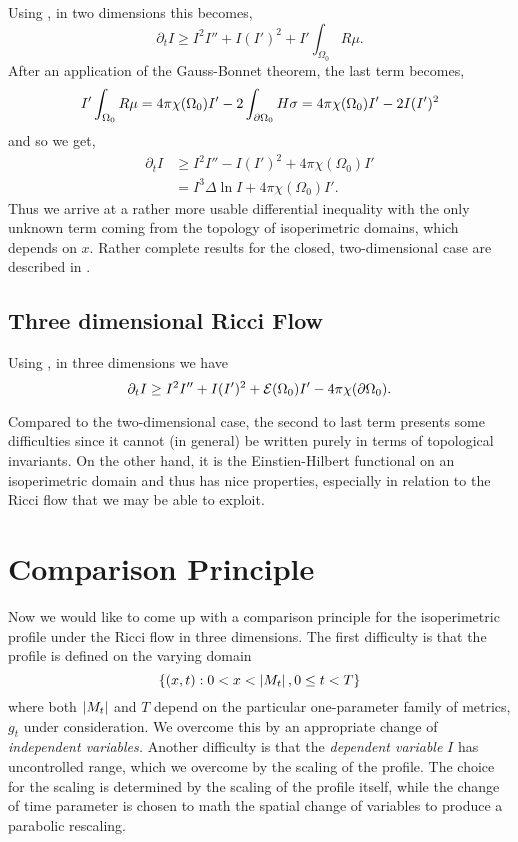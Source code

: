 \documentclass{amsart}
\begin{document}
Using , in two dimensions this becomes,
\[
\partial_t I \geq I^2I'' + I(I')^2 + I'\int_{\Omega_0} R \mu.
\]
After an application of the Gauss-Bonnet theorem, the last term becomes,
\[
I'\int_{\Omega_0} R \mu = 4\pi\chi(\Omega_0)I' - 2\int_{\partial {\Omega_0}} H \sigma = 4\pi\chi(\Omega_0)I'- 2 I (I')^2
\]
and so we get,
\begin{equation}
\label{eq:2d_viscosity_ricciflow}
\begin{split}
\partial_t I &\geq I^2I'' - I(I')^2 + 4\pi\chi(\Omega_0)I' \\
&= I^3 \Delta \ln I + 4\pi\chi(\Omega_0)I'.
\end{split}
\end{equation}
Thus we arrive at a rather more usable differential inequality with the only unknown term coming from the topology of isoperimetric domains, which depends on \(x\). Rather complete results for the closed, two-dimensional case are described in \cite{Bryan:/2016,AndrewsBryan:/2010}.

\subsection*{Three dimensional Ricci Flow}

Using , in three dimensions we have
\begin{equation}
\label{eq:3d_viscosity_ricciflow}
\partial_t I \geq I^2I'' + I(I')^2 + \operatorname{\mathcal{E}}({\Omega_0})I' - 4\pi\chi(\partial {\Omega_0}).
\end{equation}


Compared to the two-dimensional case, the second to last term presents some difficulties since it cannot (in general) be written purely in terms of topological invariants. On the other hand, it is the Einstien-Hilbert functional on an isoperimetric domain and thus has nice properties, especially in relation to the Ricci flow that we may be able to exploit.


\section{Comparison Principle}
\label{sec:comparison}

Now we would like to come up with a comparison principle for the isoperimetric profile under the Ricci flow in three dimensions. The first difficulty is that the profile is defined on the varying domain
\[
\{(x, t) : 0 < x < \left|{M_t}\right|, 0 \leq t < T\}
\]
where both \(\left|{M_t}\right|\) and \(T\) depend on the particular one-parameter family of metrics, \(g_t\) under consideration. We overcome this by an appropriate change of \emph{independent variables.} Another difficulty is that the \emph{dependent variable} \(I\) has uncontrolled range, which we overcome by the scaling of the profile. The choice for the scaling is determined by the scaling of the profile itself, while the change of time parameter is chosen to math the spatial change of variables to produce a parabolic rescaling.
\end{document}
